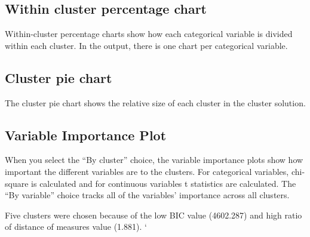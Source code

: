 

\subsection{Within cluster percentage chart} Within-cluster percentage charts show how each categorical variable is divided within each cluster. 
In the output, there is one chart per categorical variable.
\subsection{Cluster pie chart} The cluster pie chart shows the relative size of each cluster in the cluster solution.
\subsection{Variable Importance Plot} When you select the “By cluster” choice, the variable importance plots show how important the different variables are to the clusters. For categorical variables, chi-square is calculated and for continuous variables t statistics are calculated. 
The ``By variable” choice tracks all of the variables’ importance across all clusters.


Five clusters were chosen because of the low BIC value (4602.287) and high ratio of distance of measures value (1.881).
`	%

